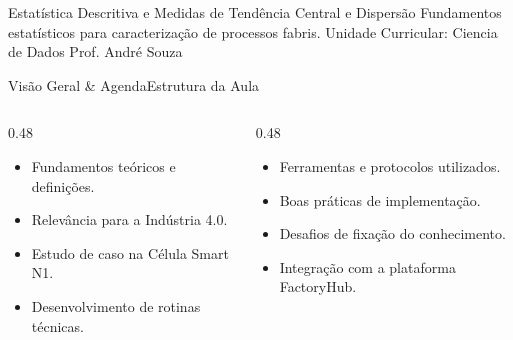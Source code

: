
\senaicover
  {Estatística Descritiva e Medidas de Tendência Central e Dispersão}
  {Fundamentos estatísticos para caracterização de processos fabris.}
  {Unidade Curricular: Ciencia de Dados}
  {Prof. André Souza}

\begin{senaiframe}{Visão Geral \& Agenda}{Estrutura da Aula}
  \begin{columns}[t]
    \begin{column}{0.48\textwidth}
      \begin{tcolorbox}[senaibluecard, title={1. Conceitos Chave}]
        \begin{itemize}
          \item Fundamentos teóricos e definições.
          \item Relevância para a Indústria 4.0.
        \end{itemize}
      \end{tcolorbox}
      \vspace{4pt}
      \begin{tcolorbox}[senaiambercard, title={3. Aplicação Prática}]
        \begin{itemize}
          \item Estudo de caso na Célula Smart N1.
          \item Desenvolvimento de rotinas técnicas.
        \end{itemize}
      \end{tcolorbox}
    \end{column}
    \begin{column}{0.48\textwidth}
      \begin{tcolorbox}[senairedcard, title={2. Detalhamento Técnico}]
        \begin{itemize}
          \item Ferramentas e protocolos utilizados.
          \item Boas práticas de implementação.
        \end{itemize}
      \end{tcolorbox}
      \vspace{4pt}
      \begin{tcolorbox}[senaigreencard, title={4. Exercícios \& Avaliação}]
        \begin{itemize}
          \item Desafios de fixação do conhecimento.
          \item Integração com a plataforma FactoryHub.
        \end{itemize}
      \end{tcolorbox}
    \end{column}
  \end{columns}
\end{senaiframe}

